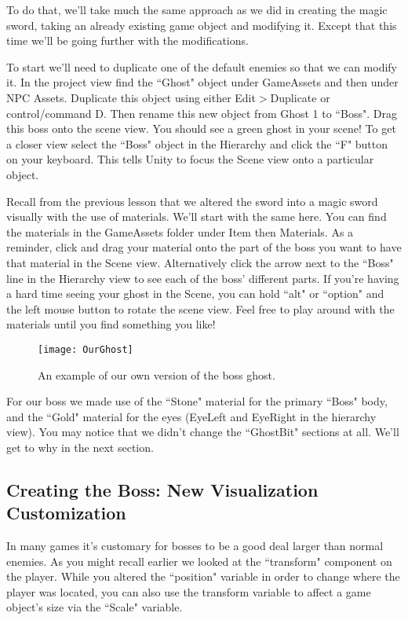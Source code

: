 \documentclass{article}
\begin{document}
To do that, we'll take much the same approach as we did in creating the magic sword, taking an already existing game object and modifying it. Except that this time we'll be going further with the modifications. 

To start we'll need to duplicate one of the default enemies so that we can modify it. In the project view find the ``Ghost" object under GameAssets and then under NPC Assets. Duplicate this object using either Edit$>$Duplicate or control/command D. Then rename this new object from Ghost 1 to ``Boss". Drag this boss onto the scene view. You should see a green ghost in your scene! To get a closer view select the ``Boss" object in the Hierarchy and click the ``F" button on your keyboard. This tells Unity to focus the Scene view onto a particular object. 

Recall from the previous lesson that we altered the sword into a magic sword visually with the use of materials. We'll start with the same here. You can find the materials in the GameAssets folder under Item then Materials. As a reminder, click and drag your material onto the part of the boss you want to have that material in the Scene view. Alternatively click the arrow next to the ``Boss" line in the Hierarchy view to see each of the boss' different parts. If you're having a hard time seeing your ghost in the Scene, you can hold ``alt" or ``option" and the left mouse button to rotate the scene view. Feel free to play around with the materials until you find something you like!

\begin{figure}
  \texttt{[image: OurGhost]}
  \caption{An example of our own version of the boss ghost.}
  \label{fig:OurGhost}
\end{figure}

For our boss we made use of the ``Stone" material for the primary ``Boss" body, and the ``Gold" material for the eyes (EyeLeft and EyeRight in the hierarchy view). You may notice that we didn't change the ``GhostBit" sections at all. We'll get to why in the next section.

\subsection{Creating the Boss: New Visualization Customization}

In many games it's customary for bosses to be a good deal larger than normal enemies. As you might recall earlier we looked at the ``transform" component on the player. While you altered the ``position" variable in order to change where the player was located, you can also use the transform variable to affect a game object's size via the ``Scale" variable. 
\end{document}
